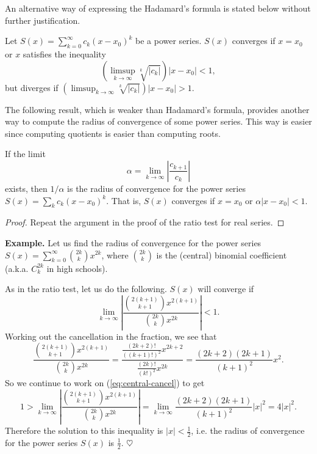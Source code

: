 \documentclass[11pt]{article}
\begin{document}
An alternative way of expressing the Hadamard's formula is stated below without further justification.

\begin{cor}
  Let $S(x) = \sum_{k=0}^\infty c_k (x-x_0)^k$ be a power series.
  $S(x)$ converges if $x = x_0$ or $x$ satisfies the inequality
  \[
    \left( \limsup_{k\to\infty} \sqrt[k]{|c_k|} \right) |x-x_0| < 1,
  \]
  but diverges if $\displaystyle \left( \limsup_{k\to\infty} \sqrt[k]{|c_k|} \right) |x-x_0| > 1$.
\end{cor}

The following result, which is weaker than Hadamard's formula, provides another way to compute the radius of convergence of some power series.
This way is easier since computing quotients is easier than computing roots.

\begin{thm}
  If the limit
  \[
    \alpha = \lim_{k \to \infty} \left| \frac{ c_{k+1} }{ c_k } \right|
  \]
  exists, then $1/\alpha$ is the radius of convergence for the power series $S(x) = \sum_k c_k (x - x_0)^k$.
  That is, $S(x)$ converges if $x = x_0$ or $\alpha |x - x_0| < 1$.
\end{thm}

\begin{proof}
  Repeat the argument in the proof of the ratio test for real series.
\end{proof}

\noindent\textbf{Example.} Let us find the radius of convergence for the power series $\displaystyle S(x) = \sum_{k=0}^\infty \binom{2k}{k} x^{2k}$, where $\displaystyle \binom{2k}{k}$ is the (central) binomial coefficient (a.k.a. $C^{2k}_k$ in high schools).

As in the ratio test, let us do the following.  $S(x)$ will converge if
\begin{equation}
  \label{eq:central-cancel}
  \lim_{k \to \infty} \left| \frac{ \binom{2(k+1)}{k+1} x^{2(k+1)} }{ \binom{2k}{k} x^{2k} } \right| < 1.
\end{equation}
Working out the cancellation in the fraction, we see that
\[
  \frac{ \binom{2(k+1)}{k+1} x^{2(k+1)} }{ \binom{2k}{k} x^{2k} } = \frac{ \frac{(2k+2)!}{((k+1)!)^2} x^{2k+2} }{ \frac{(2k)!}{(k!)^2} x^{2k} } = \frac{ (2k+2)(2k+1) }{(k+1)^2} x^2.
\]
So we continue to work on (\ref{eq:central-cancel}) to get
\[
  1 > \lim_{k\to\infty} \left| \frac{ \binom{2(k+1)}{k+1} x^{2(k+1)} }{ \binom{2k}{k} x^{2k} } \right| 
= \lim_{k \to \infty} \frac{ (2k+2)(2k+1) }{ (k+1)^2 } |x|^2 = 4 |x|^2.
\]
Therefore the solution to this inequality is $|x| < \frac{1}{2}$, i.e. the radius of convergence for the power series $S(x)$ is $\frac12$. \hfill$\heartsuit$
\end{document}
